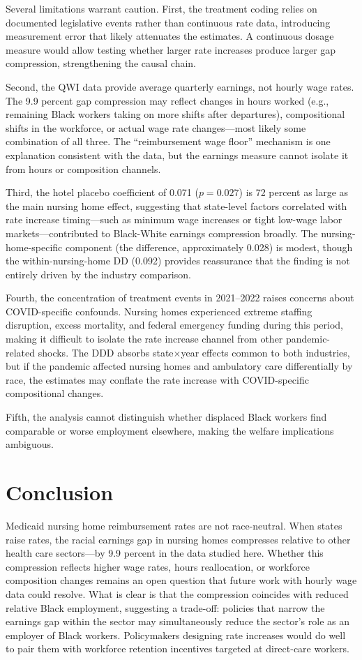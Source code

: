 \documentclass[12pt]{article}
\begin{document}
Several limitations warrant caution. First, the treatment coding relies on documented legislative events rather than continuous rate data, introducing measurement error that likely attenuates the estimates. A continuous dosage measure would allow testing whether larger rate increases produce larger gap compression, strengthening the causal chain.

Second, the QWI data provide average quarterly earnings, not hourly wage rates. The 9.9 percent gap compression may reflect changes in hours worked (e.g., remaining Black workers taking on more shifts after departures), compositional shifts in the workforce, or actual wage rate changes---most likely some combination of all three. The ``reimbursement wage floor'' mechanism is one explanation consistent with the data, but the earnings measure cannot isolate it from hours or composition channels.

Third, the hotel placebo coefficient of 0.071 ($p = 0.027$) is 72 percent as large as the main nursing home effect, suggesting that state-level factors correlated with rate increase timing---such as minimum wage increases or tight low-wage labor markets---contributed to Black-White earnings compression broadly. The nursing-home-specific component (the difference, approximately 0.028) is modest, though the within-nursing-home DD (0.092) provides reassurance that the finding is not entirely driven by the industry comparison.

Fourth, the concentration of treatment events in 2021--2022 raises concerns about COVID-specific confounds. Nursing homes experienced extreme staffing disruption, excess mortality, and federal emergency funding during this period, making it difficult to isolate the rate increase channel from other pandemic-related shocks. The DDD absorbs state$\times$year effects common to both industries, but if the pandemic affected nursing homes and ambulatory care differentially by race, the estimates may conflate the rate increase with COVID-specific compositional changes.

Fifth, the analysis cannot distinguish whether displaced Black workers find comparable or worse employment elsewhere, making the welfare implications ambiguous.

\section{Conclusion}

Medicaid nursing home reimbursement rates are not race-neutral. When states raise rates, the racial earnings gap in nursing homes compresses relative to other health care sectors---by 9.9 percent in the data studied here. Whether this compression reflects higher wage rates, hours reallocation, or workforce composition changes remains an open question that future work with hourly wage data could resolve. What is clear is that the compression coincides with reduced relative Black employment, suggesting a trade-off: policies that narrow the earnings gap within the sector may simultaneously reduce the sector's role as an employer of Black workers. Policymakers designing rate increases would do well to pair them with workforce retention incentives targeted at direct-care workers.
\end{document}

